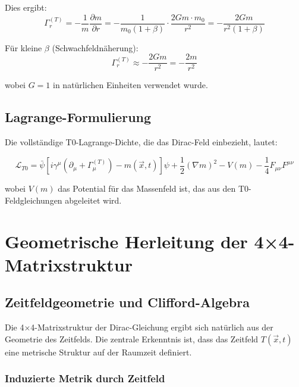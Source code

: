 \documentclass[12pt,a4paper]{article}
\newcommand{\Tfieldt}{T(\vec{x},t)}
\begin{document}
	Dies ergibt:
	\begin{equation}
		\Gamma_{r}^{(T)} = -\frac{1}{m} \frac{\partial m}{\partial r} = -\frac{1}{m_0(1+\beta)} \cdot \frac{2Gm \cdot m_0}{r^2} = -\frac{2Gm}{r^2(1+\beta)}
		\label{eq:radiale_verbindung}
	\end{equation}
	
	Für kleine $\beta$ (Schwachfeldnäherung):
	\begin{equation}
		\Gamma_{r}^{(T)} \approx -\frac{2Gm}{r^2} = -\frac{2m}{r^2}
		\label{eq:schwachfeld_verbindung}
	\end{equation}
	
	wobei $G = 1$ in natürlichen Einheiten verwendet wurde.
	
	\subsection{Lagrange-Formulierung}
	\label{subsec:lagrange_formulierung}
	
	Die vollständige T0-Lagrange-Dichte, die das Dirac-Feld einbezieht, lautet:
	
	\begin{equation}
		\mathcal{L}_{T0} = \bar{\psi}[i\gamma^{\mu}(\partial_{\mu} + \Gamma_{\mu}^{(T)}) - m(\vec{x},t)]\psi + \frac{1}{2}(\nabla m)^2 - V(m) - \frac{1}{4}F_{\mu\nu}F^{\mu\nu}
		\label{eq:t0_lagrange}
	\end{equation}
	
	wobei $V(m)$ das Potential für das Massenfeld ist, das aus den T0-Feldgleichungen abgeleitet wird.
	
\section{Geometrische Herleitung der 4×4-Matrixstruktur}
\label{sec:matrix_struktur_geometrisch}

\subsection{Zeitfeldgeometrie und Clifford-Algebra}
\label{subsec:zeitfeld_geometrie}

Die 4×4-Matrixstruktur der Dirac-Gleichung ergibt sich natürlich aus der Geometrie des Zeitfelds. Die zentrale Erkenntnis ist, dass das Zeitfeld $\Tfieldt$ eine metrische Struktur auf der Raumzeit definiert.

\subsubsection{Induzierte Metrik durch Zeitfeld}
\label{subsubsec:induzierte_metrik}
\end{document}
